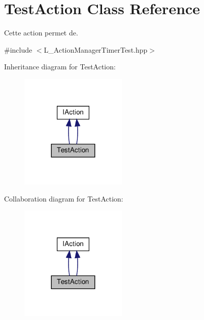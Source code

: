 \hypertarget{classTestAction}{}\section{Test\+Action Class Reference}
\label{classTestAction}


Cette action permet de.  




{\ttfamily \#include $<$L\+\_\+\+Action\+Manager\+Timer\+Test.\+hpp$>$}



Inheritance diagram for Test\+Action\+:
\nopagebreak
\begin{figure}[H]
\begin{center}
\leavevmode
\includegraphics[width=144pt]{classTestAction__inherit__graph}
\end{center}
\end{figure}


Collaboration diagram for Test\+Action\+:
\nopagebreak
\begin{figure}[H]
\begin{center}
\leavevmode
\includegraphics[width=144pt]{classTestAction__coll__graph}
\end{center}
\end{figure}
